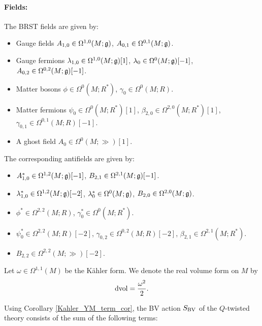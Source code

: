 \documentclass[10pt, oneside]{article}
\begin{document}
\paragraph{Fields:} The BRST fields are given by:
\begin{itemize}
\item Gauge fields $A_{1, 0} \in \Omega^{1, 0}(M; \mathfrak g)$, $A_{0, 1}\in\Omega^{0, 1}(M; \mathfrak g)$.
\item Gauge fermions $\lambda_{1, 0}\in\Omega^{1, 0}(M; \mathfrak g)[1]$, $\lambda_0\in\Omega^0(M; \mathfrak g)[-1]$, $A_{0, 2}\in\Omega^{0, 2}(M; \mathfrak g)[-1]$.
\item Matter bosons $\phi\in\Omega^0(M; R^*)$, $\gamma_0\in\Omega^0(M; R)$.
\item Matter fermions $\psi_0\in\Omega^0(M; R^*)[1]$, $\beta_{2, 0}\in\Omega^{2, 0}(M; R^*)[1]$, $\gamma_{0, 1}\in\Omega^{0, 1}(M; R)[-1]$.
\item A ghost field $A_0\in \Omega^0(M; \gg)[1]$.
\end{itemize}
The corresponding antifields are given by:
\begin{itemize}
\item $A_{1, 0}^*\in\Omega^{1, 2}(M; \mathfrak g)[-1]$, $B_{2, 1}\in\Omega^{2, 1}(M; \mathfrak g)[-1]$.
\item $\lambda_{1, 0}^*\in\Omega^{1, 2}(M; \mathfrak g)[-2]$, $\lambda_0^*\in\Omega^0(M; \mathfrak g)$, $B_{2, 0}\in\Omega^{2, 0}(M; \mathfrak g)$.
\item $\phi^*\in\Omega^{2, 2}(M; R)$, $\gamma_0^*\in\Omega^0(M; R^*)$.
\item $\psi_0^*\in\Omega^{2, 2}(M; R)[-2]$, $\gamma_{0, 2}\in\Omega^{0, 2}(M; R)[-2]$, $\beta_{2, 1}\in\Omega^{2, 1}(M; R^*)$.
\item $B_{2, 2}\in\Omega^{2, 2}(M; \gg)[-2]$.
\end{itemize}

Let $\omega\in\Omega^{1, 1}(M)$ be the K\"ahler form. We denote the real volume form on $M$ by
\[\operatorname{dvol} = \frac{\omega^2}{2}.\]

Using Corollary \ref{Kahler_YM_term_cor}, the BV action $S_{\mathrm{BV}}$ of the $Q$-twisted theory consists of the sum of the following terms:
\end{document}
